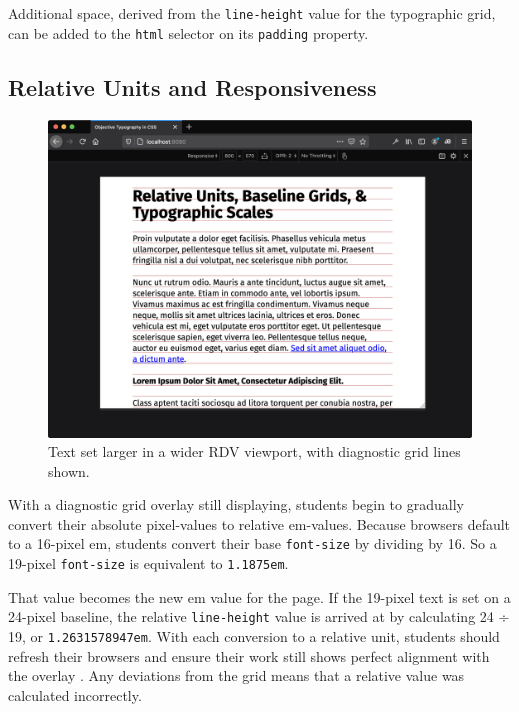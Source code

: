 \documentclass[sigplan,screen]{acmart}
\begin{document}
Additional space, derived from the \verb|line-height| value for the typographic grid, can be added to the \verb|html| selector on its \verb|padding| property.

\subsection{Relative Units and Responsiveness}

\begin{figure}
  \includegraphics[width=\linewidth]{rdv-wide}
  \caption{Text set larger in a wider RDV viewport, with diagnostic grid lines shown.}
  \label{fig:rdv-wide}
\end{figure}

With a diagnostic grid overlay still displaying, students begin to gradually convert their absolute pixel-values to relative em-values. Because browsers default to a 16-pixel em, students convert their base \verb|font-size| by dividing by 16. So a 19-pixel \verb|font-size| is equivalent to \verb|1.1875em|.

That value becomes the new em value for the page. If the 19-pixel text is set on a 24-pixel baseline, the relative \verb|line-height| value is arrived at by calculating 24 ÷ 19, or \verb|1.2631578947em|. With each conversion to a relative unit, students should refresh their browsers and ensure their work still shows perfect alignment with the overlay . Any deviations from the grid means that a relative value was calculated incorrectly.
\end{document}
